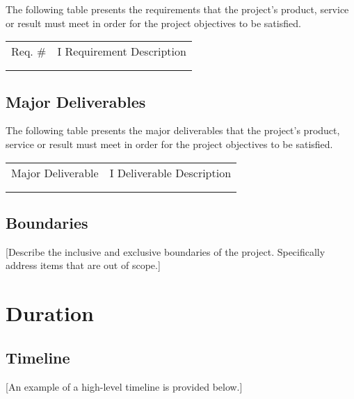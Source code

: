 \documentclass[a4paper, 11pt]{article}
\begin{document}
The following table presents the requirements that the project's
product, service or result must meet in order for the project objectives
to be satisfied.

\begin{longtable}[]{@{}ll@{}}
\toprule
\endhead
Req. \# & I Requirement Description\tabularnewline
&\tabularnewline
&\tabularnewline
\bottomrule
\end{longtable}

\hypertarget{major-deliverables}{%
\subsection{Major Deliverables}\label{major-deliverables}}

The following table presents the major deliverables that the project's
product, service or result must meet in order for the project objectives
to be satisfied.

\begin{longtable}[]{@{}ll@{}}
\toprule
\endhead
Major Deliverable & I Deliverable Description\tabularnewline
&\tabularnewline
&\tabularnewline
\bottomrule
\end{longtable}

\hypertarget{boundaries}{%
\subsection{Boundaries}\label{boundaries}}

{[}Describe the inclusive and exclusive boundaries of the project.
Specifically address items that are out of scope.{]}

\hypertarget{duration}{%
\section{Duration}\label{duration}}

\hypertarget{timeline}{%
\subsection{Timeline}\label{timeline}}

{[}An example of a high-level timeline is provided below.{]}

\end{document}
